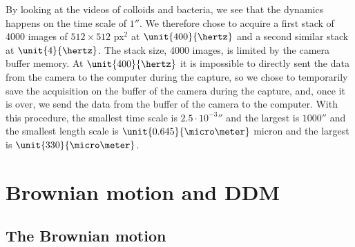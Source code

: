 \documentclass[%
 aip,
 jmp,%
 amsmath,amssymb,
reprint,%
]{revtex4-1}
\begin{document}
By looking at the videos of colloids and bacteria, we see that the dynamics happens on the time scale of $\unit{1}{\second}$. We therefore chose to acquire a first stack of 4000 images of  $512 \times 512$ px$^2$ at $\unit{400}{\hertz}$ and a second similar stack at $\unit{4}{\hertz}$. The stack size, 4000 images, is limited by the camera buffer memory. At $\unit{400}{\hertz}$ it is impossible to directly sent the data from the camera to the computer during the capture, so we chose to temporarily save the acquisition on the buffer of the camera during the capture, and, once it is over, we send the data from the buffer of the camera to the computer. With this procedure, the smallest time scale is $\unit{2.5\cdot 10^{-3}}{\second}$ and the largest is $\unit{1000}{\second}$ and the smallest length scale is $\unit{0.645}{\micro\meter}$ micron and the largest is $\unit{330}{\micro\meter}$. 



\section{Brownian motion and DDM}
\label{sec:BrownSection}

\subsection{The Brownian motion}
\end{document}
